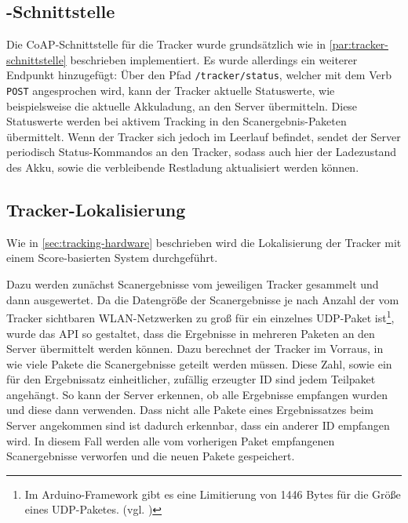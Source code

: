 \subsection{-Schnittstelle}

Die \gls{CoAP}-Schnittstelle für die Tracker wurde grundsätzlich wie in
\autoref{par:tracker-schnittstelle} beschrieben implementiert. Es wurde allerdings ein weiterer
Endpunkt hinzugefügt: Über den Pfad \texttt{/tracker/status}, welcher mit dem Verb \texttt{POST}
angesprochen wird, kann der Tracker aktuelle Statuswerte, wie beispielsweise die aktuelle
Akkuladung, an den Server übermitteln. Diese Statuswerte werden bei aktivem Tracking in den
Scanergebnis-Paketen übermittelt. Wenn der Tracker sich jedoch im Leerlauf befindet, sendet der
Server periodisch Status-Kommandos an den Tracker, sodass auch hier der Ladezustand des \gls{Akku}, sowie
die verbleibende Restladung aktualisiert werden können.

\subsection{Tracker-Lokalisierung} \label{sec:tracker-lokalisierung}

Wie in \autoref{sec:tracking-hardware} beschrieben wird die Lokalisierung der Tracker mit einem
Score-basierten System durchgeführt.

Dazu werden zunächst Scanergebnisse vom jeweiligen Tracker gesammelt und dann ausgewertet. Da die
Datengröße der Scanergebnisse je nach Anzahl der vom Tracker sichtbaren \gls{WLAN}-Netzwerken zu
groß für ein einzelnes \gls{UDP}-Paket ist\footnote{Im Arduino-Framework gibt es eine
Limitierung von 1446 Bytes für die Größe eines \gls{UDP}-Paketes. (vgl. \cite{Arduino2020})}, wurde
das \gls{API} so gestaltet, dass die Ergebnisse in mehreren Paketen an den Server übermittelt werden
können. Dazu berechnet der Tracker im Vorraus, in wie viele Pakete die Scanergebnisse geteilt werden
müssen. Diese Zahl, sowie ein für den Ergebnissatz einheitlicher, zufällig erzeugter \gls{ID} sind
jedem Teilpaket angehängt. So kann der Server erkennen, ob alle Ergebnisse empfangen wurden und
diese dann verwenden. Dass nicht alle Pakete eines Ergebnissatzes beim Server angekommen sind ist
dadurch erkennbar, dass ein anderer \gls{ID} empfangen wird. In diesem Fall werden alle vom
vorherigen Paket empfangenen Scanergebnisse verworfen und die neuen Pakete gespeichert.

